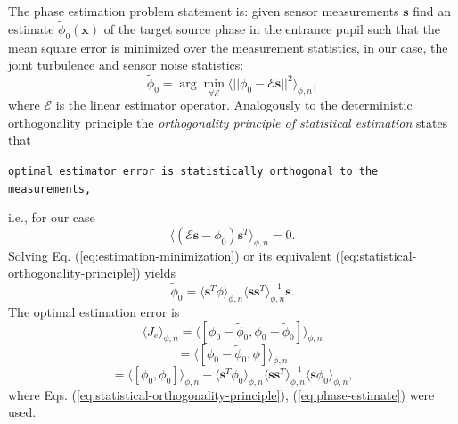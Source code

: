 The phase estimation problem statement is: given sensor measurements $\bm{s}$
find an estimate $\tilde{\phi}_{0}(\bm{x})$ of the target source phase in the
entrance pupil such
that the mean square error is minimized over the measurement statistics, in
our case, the joint turbulence and sensor noise statistics:
\begin{equation} \label{eq:estimation-minimization}
	\tilde{\phi}_{0} =
	\arg \min_{\forall \mathcal{E}}
	\langle
	||\phi_{0} - \mathcal{E} \bm{s}||^{2}
	\rangle_{\phi,n},
\end{equation}
where $\mathcal{E}$ is the linear estimator operator.
Analogously to the deterministic orthogonality principle the \emph{orthogonality
principle of statistical estimation}  states that
\begin{flushleft}
	\texttt{optimal estimator error is statistically orthogonal to the
	measurements,}
\end{flushleft}
i.e., for our case
\begin{equation} \label{eq:statistical-orthogonality-principle}
	\langle ( \mathcal{E}\bm{s} - \phi_{0} ) \bm{s}^{T} \rangle_{\phi,n} = 0.
\end{equation}
Solving Eq. (\ref{eq:estimation-minimization}) or its equivalent
(\ref{eq:statistical-orthogonality-principle}) yields
\begin{equation} \label{eq:phase-estimate}
	\tilde{\phi}_{0} = \langle \bm{s}^{T} \phi \rangle_{\phi,n}
	                   \langle \bm{s} \bm{s}^{T} \rangle_{\phi,n}^{-1} \bm{s}.
\end{equation}
The optimal estimation error is
\begin{equation} \label{eq:estimation-error}
  \langle J_{e} \rangle_{\phi,n} =
	\langle
	[\phi_{0} - \tilde{\phi}_{0},\phi_{0} - \tilde{\phi}_{0}]
	\rangle_{\phi,n}
\end{equation}
$$
  = \langle [\phi_{0} - \tilde{\phi}_{0},\phi] \rangle_{\phi,n}
$$
$$
  = \langle [\phi_{0},\phi_{0}] \rangle_{\phi,n} -
    \langle \bm{s}^{T} \phi_{0} \rangle_{\phi,n}
	  \langle \bm{ss}^{T} \rangle_{\phi,n}^{-1}
	  \langle \bm{s} \phi_{0} \rangle_{\phi,n},
$$
where Eqs. (\ref{eq:statistical-orthogonality-principle}),
           (\ref{eq:phase-estimate}) were used.

